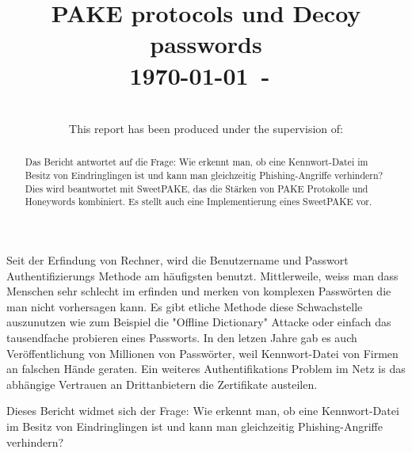 \documentclass[conference, compsoc]{IEEEtran}
\begin{document}
\title{PAKE protocols und Decoy passwords\\
{\small \today~-~\currenttime}}

\author{
    \\
    This report has been produced under the supervision of:\\
    }

\maketitle

\begin{abstract}
Das Bericht antwortet auf die Frage: Wie erkennt man, ob eine Kennwort-Datei im
	Besitz von Eindringlingen ist und kann man gleichzeitig
	Phishing-Angriffe verhindern?  Dies wird beantwortet mit SweetPAKE, das
	die Stärken von PAKE Protokolle und Honeywords kombiniert. Es stellt
	auch eine Implementierung eines SweetPAKE vor.
\end{abstract}


\section{}
Seit der Erfindung von Rechner, wird die Benutzername und Passwort
Authentifizierungs Methode am häufigsten benutzt. Mittlerweile, weiss man dass
Menschen sehr schlecht im erfinden und merken von komplexen Passwörten die man
nicht vorhersagen kann. Es gibt etliche Methode diese Schwachstelle auszunutzen
wie zum Beispiel die "Offline Dictionary" Attacke oder einfach das tausendfache
probieren eines Passworts. In den letzen Jahre gab es auch Veröffentlichung von
Millionen von Passwörter, weil Kennwort-Datei von Firmen an falschen Hände
geraten. Ein weiteres Authentifikations Problem im Netz is das abhängige
Vertrauen an Drittanbietern die Zertifikate austeilen. 

Dieses Bericht widmet sich der Frage: Wie erkennt man, ob eine Kennwort-Datei
im Besitz von Eindringlingen ist und kann man gleichzeitig Phishing-Angriffe
verhindern? 
\end{document}
